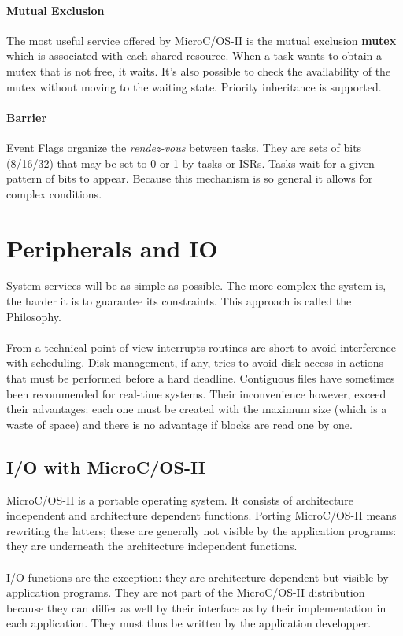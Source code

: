 \documentclass[../main.tex]{subfiles}
\begin{document}
\paragraph{Mutual Exclusion} The most useful service offered by MicroC/OS-II is the mutual exclusion \textbf{mutex} which is associated with each shared resource. When a task wants to obtain a mutex that is not free, it waits. It's also possible to check the availability of the mutex without moving to the waiting state. Priority inheritance is supported.

\paragraph{Barrier} Event Flags organize the \textit{rendez-vous} between tasks. They are sets of bits (8/16/32) that may be set to 0 or 1 by tasks or ISRs. Tasks wait for a given pattern of bits to appear. Because this mechanism is so general it allows for complex conditions.

\section{Peripherals and IO}
System services will be as simple as possible.
The more complex the system is, the harder it is to guarantee its constraints.
This approach is called the  Philosophy.
\\\\
From a technical point of view interrupts routines are short to avoid interference with scheduling. Disk management, if any, tries to avoid disk access in actions that must be performed before a hard deadline. Contiguous files have sometimes been recommended for real-time systems. Their inconvenience however, exceed their advantages: each one must be created with the maximum size (which is a waste of space) and there is no advantage if blocks are read one by one.

\subsection{I/O with MicroC/OS-II}
MicroC/OS-II is a portable operating system. It consists of architecture independent and architecture dependent functions. Porting MicroC/OS-II means rewriting the latters; these are generally not visible by the application programs: they are underneath the architecture independent functions.
\\\\
I/O functions are the exception: they are architecture dependent but visible by application programs. They are not part of the MicroC/OS-II distribution because they can differ as well by their interface as by their implementation in each application. They must thus be written by the application developper.
\end{document}
